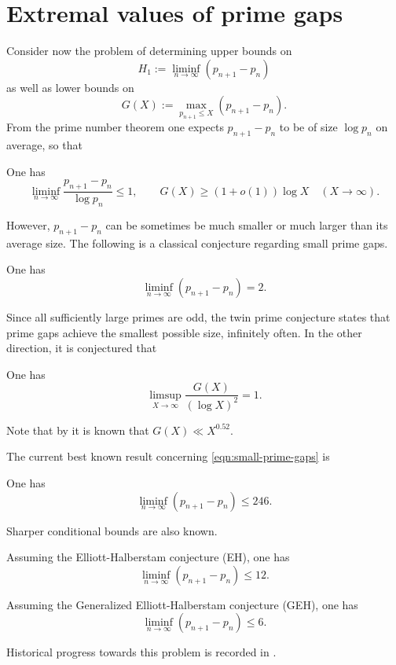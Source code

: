\section{Extremal values of prime gaps}

Consider now the problem of determining upper bounds on
\begin{equation}\label{eqn:small-prime-gaps}
H_1 := \liminf_{n\to\infty}(p_{n + 1} - p_n)
\end{equation}
as well as lower bounds on
\begin{equation}\label{eqn:large-prime-gaps}
G(X) := \max_{p_{n + 1} \le X}(p_{n + 1} - p_n).
\end{equation}
From the prime number theorem one expects $p_{n + 1} - p_n$ to be of size $\log p_n$ on average, so that
\begin{theorem}
One has
\[
\liminf_{n\to\infty}\frac{p_{n + 1} - p_n}{\log p_n} \le 1,\qquad G(X) \ge (1 + o(1)) \log X\quad (X \to \infty).
\]
\end{theorem}

However, $p_{n + 1} - p_n$ can be sometimes be much smaller or much larger than its average size. The following is a classical conjecture regarding small prime gaps.

\begin{conjecture}
One has
\[
\liminf_{n\to\infty}(p_{n + 1} - p_n) = 2.
\]
\end{conjecture}

Since all sufficiently large primes are odd, the twin prime conjecture states that prime gaps achieve the smallest possible size, infinitely often. In the other direction, it is conjectured that
\begin{conjecture}
One has
\[
\limsup_{X \to \infty}\frac{G(X)}{(\log X)^2} = 1.
\]
\end{conjecture}
Note that by  it is known that $G(X) \ll X^{0.52}$.

The current best known result concerning \eqref{eqn:small-prime-gaps} is
\begin{theorem}
One has
\[
\liminf_{n\to\infty}(p_{n + 1} - p_n) \le 246.
\]
\end{theorem}

Sharper conditional bounds are also known.
\begin{theorem}
Assuming the Elliott-Halberstam conjecture (EH), one has
\[
\liminf_{n\to\infty}(p_{n + 1} - p_n) \le 12.
\]
\end{theorem}
\begin{theorem}
Assuming the Generalized Elliott-Halberstam conjecture (GEH), one has
\[
\liminf_{n\to\infty}(p_{n + 1} - p_n) \le 6.
\]
\end{theorem}
Historical progress towards this problem is recorded in .

